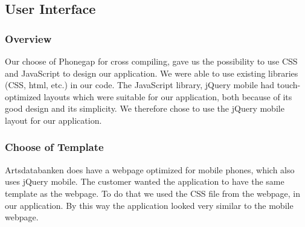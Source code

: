 \subsection{User Interface}
	\subsubsection{Overview}
	Our choose of Phonegap for cross compiling, gave us the possibility to use CSS and JavaScript to design our application. We were able to use existing libraries (CSS, html, etc.) in our code. The JavaScript library, jQuery mobile had touch-optimized layouts which were suitable for our application, both because of its good design and its simplicity. We therefore chose to use the jQuery mobile layout for our application.  

\subsubsection{Choose of Template}
Artsdatabanken does have a webpage optimized for mobile phones, which also uses jQuery mobile. The customer wanted the application to have the same template as the webpage. To do that we used the CSS file from the webpage, in our application. By this way the application looked very similar to the mobile webpage. 
